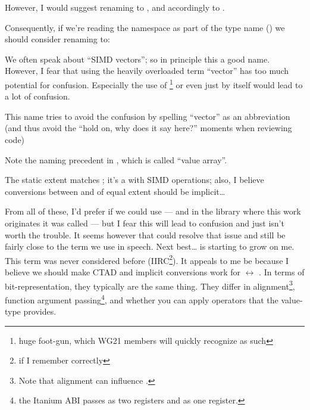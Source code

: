 However, I would suggest renaming \std{}\MayBreak\mask to
\std{}\MayBreak{}, and accordingly 
to .

Consequently, if we're reading the namespace as part of the type name
() we should consider renaming  to:
\begin{list}{}{
  \setlength{\topsep}{0pt}%
  \setlength{\leftmargin}{7em}%
  \setlength{\rightmargin}{0pt}%
  \setlength{\labelwidth}{7em}%
}

  \item[\code{simd::vector}]
    We often speak about “SIMD vectors”; so in principle this a good name.
    However, I fear that using the heavily overloaded term “vector” has too
    much potential for confusion.
    Especially the use of \footnote{huge foot-gun, which WG21 members will quickly
    recognize as such} or even just  by
    itself would lead to a lot of confusion.

  \item[\code{simd::vec}]
    This name tries to avoid the confusion by spelling “vector” as an
    abbreviation (and thus avoid the “hold on, why does it say 
    here?” moments when reviewing code)

  \item[\code{simd::value}]
    Note the naming precedent in , which is called “value
    array”.

  \item[\code{simd::values}]

  \item[\code{simd::array}]
    The static extent matches \std{}; it's a \std{} with
    SIMD operations; also, I believe conversions between  and
    \std{} of equal extent should be implicit\ldots
\end{list}

From all of these, I'd prefer if we could use  --- and
in the library where this work originates it was called 
--- but I fear this will lead to confusion and just isn't worth the trouble.
It seems however that  could resolve that issue and still
be fairly close to the term we use in speech.
Next best\ldots{}  is starting to grow on me.
This term was never considered before (IIRC\footnote{if I remember
correctly}).
It appeals to me be because I believe we should make CTAD and implicit
conversions work for  $\leftrightarrow$ .
In terms of bit-representation, they typically are the same thing.
They differ in alignment\footnote{Note that alignment can influence
.}, function argument passing\footnote{\Eg the Itanium ABI passes
   as two  registers and 
as one  register.}, and whether you can apply operators that the
value-type provides.

